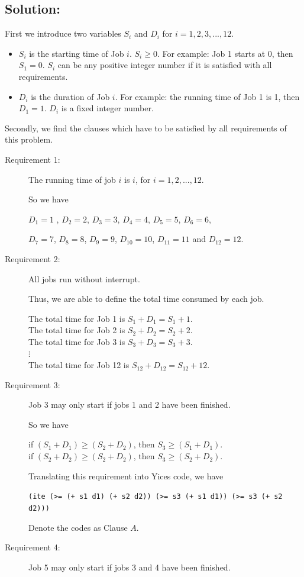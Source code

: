 \documentclass[11pt]{article}
\begin{document}
{\vspace{4mm}

\subsection*{Solution:}
First we introduce two variables $S_{i}$ and $D_{i}$ for $i = 1,2,3,...,12$.
\begin{itemize}
  \item $S_{i}$ is the starting time of Job $i$. $S_{i} \geq 0$. For example: Job 1 starts at 0, then $S_{1} = 0$. $S_{i}$ can be any positive integer number if it is satisfied with all requirements.
  \item $D_{i}$ is the duration of Job $i$. For example: the running time of Job 1 is 1, then $D_{1} = 1$. $D_{i}$ is a fixed integer number.
\end{itemize}

Secondly, we find the clauses which have to be satisfied by  all requirements of this problem.

\begin{description}
  \item[Requirement 1:] The running time of job $i$ is $i$, for $i = 1, 2, . . . , 12$.

  So we have

  $D_{1}=1$ , $D_{2}=2$, $D_{3}=3$, $D_{4}=4$, $D_{5}=5$, $D_{6}=6$,

  $D_{7}=7$, $D_{8}=8$, $D_{9}=9$, $D_{10}=10$, $D_{11}=11$ and $D_{12}=12$.
  \item[Requirement 2:] All jobs run without interrupt.

  Thus, we are able to define the total time consumed by each job. \\
    \begin{center}
    The total time for Job 1 is $S_{1}+D_{1}=S_{1}+1$.\\
    The total time for Job 2 is $S_{2}+D_{2}=S_{2}+2$.\\
    The total time for Job 3 is $S_{3}+D_{3}=S_{3}+3$.\\
    $\vdots$\\
    The total time for Job 12 is $S_{12}+D_{12}=S_{12}+12$.
    \end{center}
  \item[Requirement 3:] Job 3 may only start if jobs 1 and 2 have been finished.

  So we have
  \begin{center}
  if $(S_{1}+D_{1}) \geq (S_{2}+D_{2})$, then $S_{3} \geq (S_{1}+D_{1})$.\\
  if $(S_{2}+D_{2}) \geq (S_{2}+D_{2})$, then $S_{3} \geq (S_{2}+D_{2})$.
  \end{center}
  Translating this requirement into Yices code, we have
  \begin{center}
  {\tt (ite (>= (+ s1 d1) (+ s2 d2)) (>= s3 (+ s1 d1)) (>= s3 (+ s2 d2)))}
  \end{center}
  Denote the codes as Clause $A$.
  \item[Requirement 4:] Job 5 may only start if jobs 3 and 4 have been finished.


\end{description}}
\end{document}
